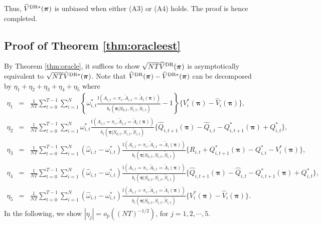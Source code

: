 \documentclass{article}
\begin{document}
Thus, $\widehat{V}^{\hbox{\scriptsize{DR}}*}(\bm{\pi})$ is unbiased when either (A3) or (A4) holds. The proof is hence completed. 

\subsection{Proof of Theorem \ref{thm:oracleest}}
By Theorem \ref{thm:oracle}, it suffices to show $\sqrt{NT}\widehat{V}^{\hbox{\scriptsize{DR}}}(\bm{\pi})$ is asymptotically equivalent to $\sqrt{NT}\widehat{V}^{\hbox{\scriptsize{DR}}*}(\bm{\pi})$. Note that $\widehat{V}^{\hbox{\scriptsize{DR}}}(\bm{\pi})-\widehat{V}^{\hbox{\scriptsize{DR}}*}(\bm{\pi})$ can be decomposed by $\eta_1+\eta_2+\eta_3+\eta_4+\eta_5$ where
\begin{eqnarray*}
	\eta_1&=&	\frac{1}{NT}\sum_{t=0}^{T-1}\sum_{i=1}^N \left\{\omega_{i,t}^*\frac{\mathbb{I}(A_{i,t}=\pi_i,\widetilde{A}_{i,t}=\widetilde{A}_i(\bm{\pi}))}{b_i(\bm{\pi}|S_{0,t},S_{i,t},\widetilde{S}_{i,t})}-1\right\}\{V_i^*(\bm{\pi})- \widehat{V}_i(\bm{\pi}) \},\\
	\eta_2&=&%
	\frac{1}{NT}\sum_{t=0}^{T-1}\sum_{i=1}^N \omega_{i,t}^*\frac{\mathbb{I}(A_{i,t}=\pi_i,\widetilde{A}_{i,t}=\widetilde{A}_i(\bm{\pi}))}{b_i(\bm{\pi}|S_{0,t},S_{i,t},\widetilde{S}_{i,t})}\{\widehat{Q}_{i,t+1}(\bm{\pi})-\widehat{Q}_{i,t}-Q_{i,t+1}^*(\bm{\pi})+Q_{i,t}^* \},\\
	\eta_3&=&\frac{1}{NT}\sum_{t=0}^{T-1}\sum_{i=1}^N (\widehat{\omega}_{i,t}-\omega_{i,t}^*)\frac{\mathbb{I}(A_{i,t}=\pi_i,\widetilde{A}_{i,t}=\widetilde{A}_i(\bm{\pi}))}{b_i(\bm{\pi}|S_{0,t},S_{i,t},\widetilde{S}_{i,t})}
	\{R_{i,t}+Q_{i,t+1}^*(\bm{\pi})-Q_{i,t}^*-V_i^*(\bm{\pi})\},\\
	\eta_4&=&\frac{1}{NT}\sum_{t=0}^{T-1}\sum_{i=1}^N (\widehat{\omega}_{i,t}-\omega_{i,t}^*)\frac{\mathbb{I}(A_{i,t}=\pi_i,\widetilde{A}_{i,t}=\widetilde{A}_i(\bm{\pi}))}{b_i(\bm{\pi}|S_{0,t},S_{i,t},\widetilde{S}_{i,t})}\{\widehat{Q}_{i,t+1}(\bm{\pi})-\widehat{Q}_{i,t}-Q_{i,t+1}^*(\bm{\pi})+Q_{i,t}^* \},\\
	\eta_5&=&\frac{1}{NT}\sum_{t=0}^{T-1}\sum_{i=1}^N (\widehat{\omega}_{i,t}-\omega_{i,t}^*)\frac{\mathbb{I}(A_{i,t}=\pi_i,\widetilde{A}_{i,t}=\widetilde{A}_i(\bm{\pi}))}{b_i(\bm{\pi}|S_{0,t},S_{i,t},\widetilde{S}_{i,t})}\{V_i^*(\bm{\pi})-\widehat{V}_i(\bm{\pi}) \}.
\end{eqnarray*}
In the following, we show $|\eta_j|=o_p((NT)^{-1/2})$, for $j=1,2,\cdots,5$. 
\end{document}

